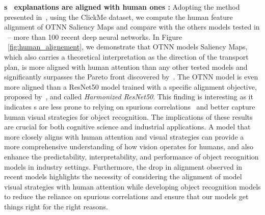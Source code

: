 \textbf{\otnn s~ explanations are aligned with human ones : }
Adopting the method presented in~\cite{linsley2017visual}, using the ClickMe dataset, we compute the human feature alignment of OTNN Saliency Maps and compare with the others models tested in ~\cite{ fel2022aligning}-- more than 100 recent deep neural networks. In Figure ~\ref{fig:human_alignement}, we demonstrate that 
OTNN models Saliency Maps, %
which also carries a theoretical interpretation as the direction of the transport plan,  is more aligned with human attention than any other tested models and significantly surpasses the Pareto front discovered by~\cite{fel2022aligning}. The OTNN model is even more aligned than a ResNet50 model trained with a specific alignment objective, proposed by~\cite{fel2022aligning}, and called \textit{Harmonized ResNet50}. 
This finding is interesting as it indicates \otnn s are less prone to relying on spurious correlations~\cite{geirhos2020shortcut} and 
better capture
human visual strategies for object recognition.
The implications of these results are crucial for both cognitive science and industrial applications. A model that more closely aligns with human attention and visual strategies can provide a more comprehensive understanding of how vision operates for humans, and also enhance the predictability, interpretability, and performance of object recognition models in industry settings. 
Furthermore, the drop in alignment observed in recent models highlights the necessity of considering the alignment of model visual strategies with human attention while developing object recognition models to reduce the reliance on spurious correlations and ensure that our models get things right for the right reasons.

